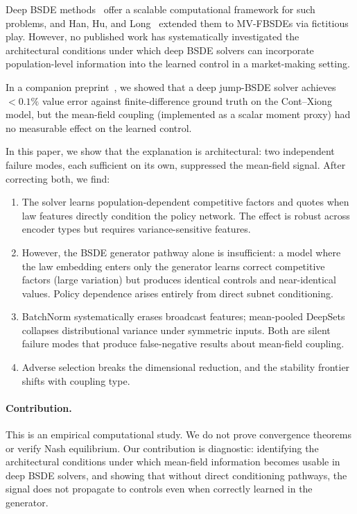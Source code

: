 \documentclass[11pt,a4paper]{article}
\begin{document}
Deep BSDE methods~\cite{han2018solving, e2017deep} offer a scalable computational framework for such problems, and Han, Hu, and Long~\cite{han2022learning} extended them to MV-FBSDEs via fictitious play. However, no published work has systematically investigated the architectural conditions under which deep BSDE solvers can incorporate population-level information into the learned control in a market-making setting.

In a companion preprint~\cite{garry2026preprint1}, we showed that a deep jump-BSDE solver achieves $<0.1\%$ value error against finite-difference ground truth on the Cont--Xiong model, but the mean-field coupling (implemented as a scalar moment proxy) had no measurable effect on the learned control.

In this paper, we show that the explanation is architectural: two independent failure modes, each sufficient on its own, suppressed the mean-field signal. After correcting both, we find:
\begin{enumerate}
  \item The solver learns population-dependent competitive factors and quotes when law features directly condition the policy network. The effect is robust across encoder types but requires variance-sensitive features.
  \item However, the BSDE generator pathway alone is insufficient: a model where the law embedding enters only the generator learns correct competitive factors (large variation) but produces identical controls and near-identical values. Policy dependence arises entirely from direct subnet conditioning.
  \item BatchNorm systematically erases broadcast features; mean-pooled DeepSets collapses distributional variance under symmetric inputs. Both are silent failure modes that produce false-negative results about mean-field coupling.
  \item Adverse selection breaks the dimensional reduction, and the stability frontier shifts with coupling type.
\end{enumerate}

\paragraph{Contribution.} This is an empirical computational study. We do not prove convergence theorems or verify Nash equilibrium. Our contribution is diagnostic: identifying the architectural conditions under which mean-field information becomes usable in deep BSDE solvers, and showing that without direct conditioning pathways, the signal does not propagate to controls even when correctly learned in the generator.
\end{document}
